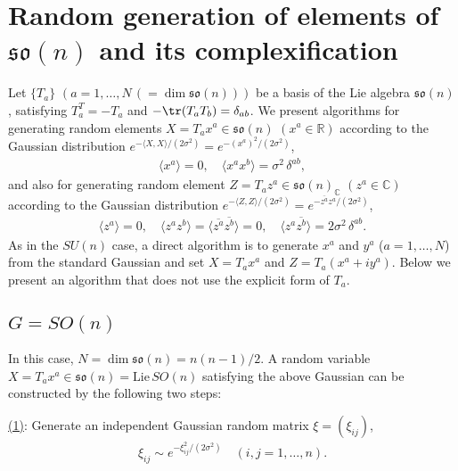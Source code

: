 \section{Random generation of elements of $\mathfrak{so}(n)$ and its complexification}
\label{sec:Gaussian_SOn}

Let $\{T_a\}$ $(a = 1,\ldots, N\,(=\dim \mathfrak{so}(n)))$ be a basis of the Lie algebra $\mathfrak{so}(n)$, satisfying
$T_a^T = -T_a$ and $-\tr (T_a T_b) = \delta_{ab}$.
We present algorithms for generating random elements $X = T_a x^a \in \mathfrak{so}(n)$ $(x^a \in \mathbb{R})$ according to the Gaussian distribution $e^{-\langle X,X\rangle/(2\sigma^2)} = e^{-(x^a)^2/(2\sigma^2)}$,
\begin{align}
  \langle x^a \rangle = 0,\quad \langle x^a x^b \rangle = \sigma^2\,\delta^{ab},
\end{align}
and also for generating random element $Z = T_a z^a \in \mathfrak{so}(n)_\mathbb{C}$ $(z^a \in \mathbb{C})$ according to the Gaussian distribution $e^{-\langle Z,Z\rangle/(2\sigma^2)} = e^{- \overline{z^a} z^a/(2\sigma^2)}$,
\begin{align}
  \langle z^a \rangle = 0,\quad \langle z^a z^b \rangle = \langle \overline{z^a} \overline{z^b} \rangle = 0,\quad \langle z^a \overline{z^b} \rangle = 2\sigma^2\,\delta^{ab}.
\end{align}
As in the $SU(n)$ case, a direct algorithm is to generate $x^a$ and $y^a$ ($a=1,\ldots,N$) from the standard Gaussian and set $X = T_a x^a$ and $Z = T_a (x^a + i y^a)$. Below we present an algorithm that does not use the explicit form of $T_a$.

\subsection{$G = SO(n)$}
\label{sec:Gaussian_SO(n)}

In this case, $N = \dim \mathfrak{so}(n) = n(n-1)/2$. A random variable $X = T_a x^a \in \mathfrak{so}(n) = \mathrm{Lie}\,SO(n)$ satisfying the above Gaussian can be constructed by the following two steps:

\noindent\underline{(1)}: Generate an independent Gaussian random matrix $\xi = (\xi_{ij})$,
\begin{align}
  \xi_{ij} \sim e^{-\xi_{ij}^2/(2\sigma^2)}\quad (i,j = 1,\ldots,n).
\end{align}


